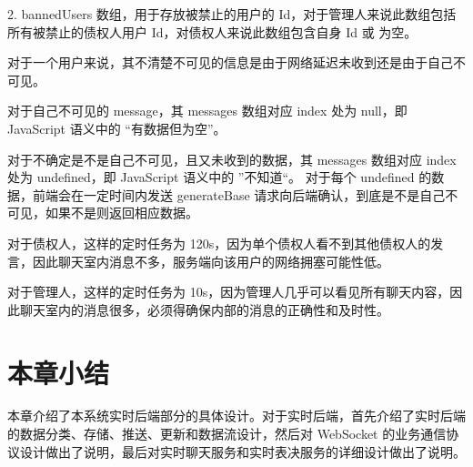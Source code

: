   2. bannedUsers 数组，用于存放被禁止的用户的 Id，对于管理人来说此数组包括所有被禁止的债权人用户 Id，对债权人来说此数组包含自身 Id 或 为空。

对于一个用户来说，其不清楚不可见的信息是由于网络延迟未收到还是由于自己不可见。

对于自己不可见的 message，其 messages 数组对应 index 处为 null，即 JavaScript 语义中的 “有数据但为空”。

对于不确定是不是自己不可见，且又未收到的数据，其 messages 数组对应 index 处为 undefined，即 JavaScript 语义中的 ”不知道“。
对于每个 undefined 的数据，前端会在一定时间内发送 generateBase 请求向后端确认，到底是不是自己不可见，如果不是则返回相应数据。

对于债权人，这样的定时任务为 120s，因为单个债权人看不到其他债权人的发言，因此聊天室内消息不多，服务端向该用户的网络拥塞可能性低。

对于管理人，这样的定时任务为 10s，因为管理人几乎可以看见所有聊天内容，因此聊天室内的消息很多，必须得确保内部的消息的正确性和及时性。



  \section{本章小结}
  本章介绍了本系统实时后端部分的具体设计。对于实时后端，首先介绍了实时后端的数据分类、存储、推送、更新和数据流设计，然后对 WebSocket 的业务通信协议设计做出了说明，最后对实时聊天服务和实时表决服务的详细设计做出了说明。